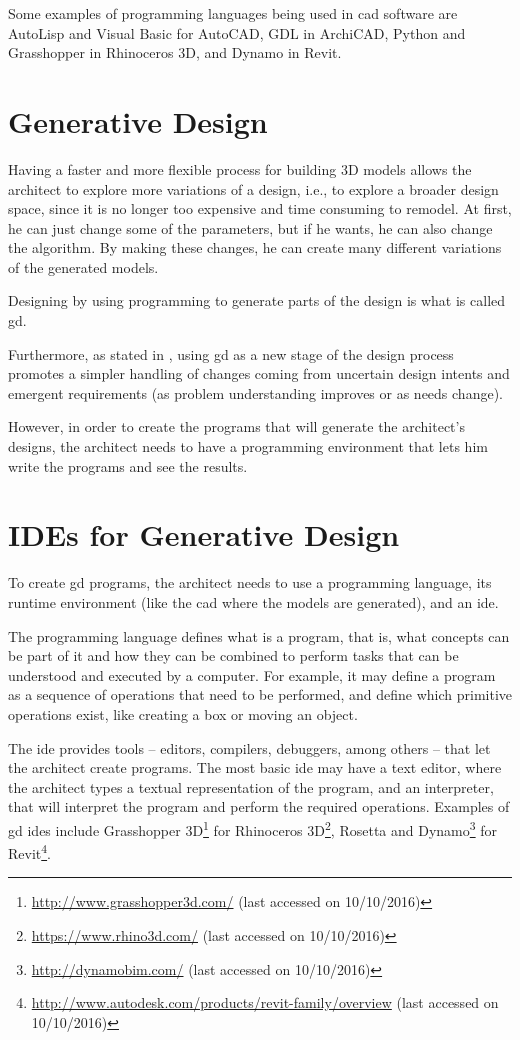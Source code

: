 Some examples of programming languages being used in \gls{cad} software are AutoLisp and Visual Basic for AutoCAD, GDL in ArchiCAD, Python and Grasshopper in Rhinoceros 3D, and Dynamo in Revit.


\section{Generative Design}
Having a faster and more flexible process for building 3D models allows the architect to explore more variations of a design, i.e., to explore a broader design space, since it is no longer too expensive and time consuming to remodel.
At first, he can just change some of the parameters, but if he wants, he can also change the algorithm.
By making these changes, he can create many different variations of the generated models.

Designing by using programming to generate parts of the design is what is called \gls{gd}.

Furthermore, as stated in \cite{leitao2014pushing}, using \gls{gd} as a new stage of the design process promotes a simpler handling of changes coming from uncertain design intents and emergent requirements (as problem understanding improves or as needs change).


However, in order to create the programs that will generate the architect's designs, the architect needs to have a programming environment that lets him write the programs and see the results.


\section{IDEs for Generative Design}
To create \gls{gd} programs, the architect needs to use a programming language, its runtime environment (like the \gls{cad} where the models are generated), and an \gls{ide}.

The programming language defines what is a program, that is, what concepts can be part of it and how they can be combined to perform tasks that can be understood and executed by a computer.
For example, it may define a program as a sequence of operations that need to be performed, and define which primitive operations exist, like creating a box or moving an object.

The \gls{ide} provides tools -- editors, compilers, debuggers, among others -- that let the architect create programs.
The most basic \gls{ide} may have a text editor, where the architect types a textual representation of the program, and an interpreter, that will interpret the program and perform the required operations.
Examples of \gls{gd} \glspl{ide} include Grasshopper 3D\footnote{\url{http://www.grasshopper3d.com/} (last accessed on 10/10/2016)} for Rhinoceros 3D\footnote{\url{https://www.rhino3d.com/} (last accessed on 10/10/2016)}, Rosetta\cite{de2012modern} and Dynamo\footnote{\url{http://dynamobim.com/} (last accessed on 10/10/2016)} for Revit\footnote{\url{http://www.autodesk.com/products/revit-family/overview} (last accessed on 10/10/2016)}.

